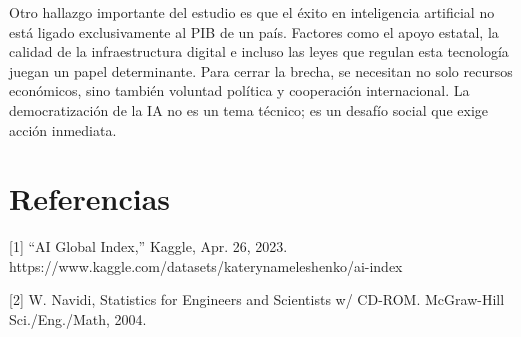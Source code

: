 \documentclass[
]{article}
\begin{document}
\begin{multicols}{2}
Otro hallazgo importante del estudio es que el éxito en inteligencia artificial no está ligado exclusivamente al PIB de un país. Factores como el apoyo estatal, la calidad de la infraestructura digital e incluso las leyes que regulan esta tecnología juegan un papel determinante. Para cerrar la brecha, se necesitan no solo recursos económicos, sino también voluntad política y cooperación internacional. La democratización de la IA no es un tema técnico; es un desafío social que exige acción inmediata.

\section{Referencias}
[1]   “AI Global Index,” Kaggle, Apr. 26, 2023.         https://www.kaggle.com/datasets/katerynameleshenko/ai-index

[2]   W. Navidi, Statistics for Engineers and Scientists w/ CD-ROM. McGraw-Hill Sci./Eng./Math, 2004.

\end{multicols}
\end{document}
